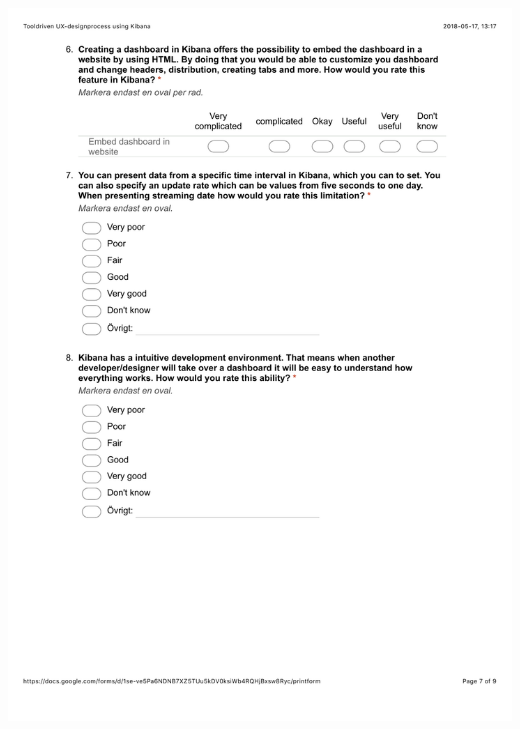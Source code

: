 \documentclass[12pt]{kththesis}
\begin{document}
\begin{appendices}
\includegraphics[width=1\textwidth]{UX_designprocess7.pdf}
\newpage

\end{appendices}
\end{document}

